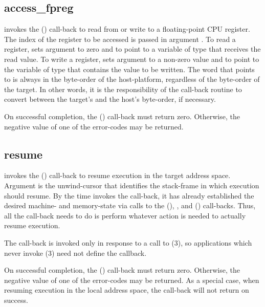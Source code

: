 \documentclass{article}
\begin{document}
\subsection{access\_fpreg}

 invokes the () call-back to read
from or write to a floating-point CPU register.  The index of the
register to be accessed is passed in argument .  To read a
register,  sets argument  to zero and
 to point to a variable of type  that
receives the read value.  To write a register,  sets
argument  to a non-zero value and  to point to
the variable of type  that contains the value to
be written.  The word that  points to is always in the
byte-order of the host-platform, regardless of the byte-order of the
target.  In other words, it is the responsibility of the call-back
routine to convert between the target's and the host's byte-order, if
necessary.

On successful completion, the () call-back must
return zero.  Otherwise, the negative value of one of the
 error-codes may be returned.

\subsection{resume}

 invokes the () call-back to resume
execution in the target address space.  Argument  is the
unwind-cursor that identifies the stack-frame in which execution
should resume.  By the time  invokes the 
call-back, it has already established the desired machine- and
memory-state via calls to the (),
, and () call-backs.  Thus, all
the call-back needs to do is perform whatever action is needed to
actually resume execution.

The  call-back is invoked only in response to a call to
(3), so applications which never invoke
(3) need not define the  callback.

On successful completion, the () call-back must return
zero.  Otherwise, the negative value of one of the
 error-codes may be returned.  As a special case,
when resuming execution in the local address space, the call-back will
not return on success.
\end{document}
